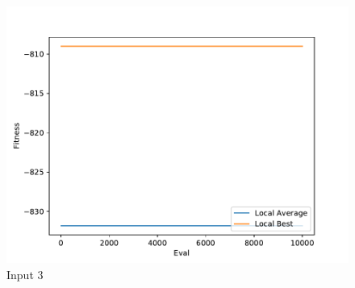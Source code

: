 \documentclass{standalone}
\begin{document}
\begin{figure}[!htb]
	\caption{Input 3}
	\label{fig:graph_3054}
	\includegraphics[width=\textwidth]{../graphs/graphs/3054.pdf}
\end{figure}
\end{document}
